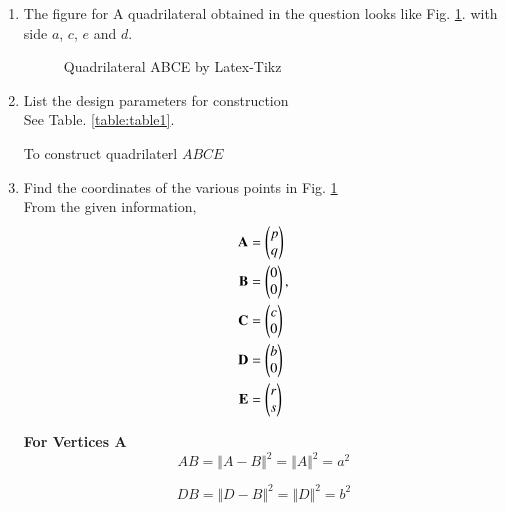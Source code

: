 \renewcommand{\theequation}{\theenumi}
\begin{enumerate}[label=\thesection.\arabic*.,ref=\thesection.\theenumi]
\item The figure for A quadrilateral obtained in the question looks like Fig. \ref{fig:quad}.
with side $a$, $c$, $e$ and $d$.
\\
\begin{figure}[!ht]
\centering
\resizebox{\columnwidth}{!}{}
\caption{Quadrilateral ABCE by Latex-Tikz}
\label{fig:quad}	
\end{figure}
%
%
%
\item List the design parameters for construction
\label{const:table1}
\\
\solution See Table. \ref{table:table1}. 
%
\begin{table}[ht!]
\centering

\caption{To construct quadrilaterl $ABCE$}
\label{table:table1}	
\end{table}
\item Find the coordinates of the various points in Fig. \ref{fig:quad}
\label{const:quad}
\\
%
\solution From the given information, 
\begin{align}
\label{eq:constr_a}
\mathbf{A} &= \begin{pmatrix}p\\q\end{pmatrix} 
\\
\mathbf{B} &= \begin{pmatrix}0\\0\end{pmatrix}, 
\label{eq:constr_b}
\\
\mathbf{C} &= \begin{pmatrix}c\\0\end{pmatrix}
\label{eq:constr_c}
\\
\mathbf{D} &= \begin{pmatrix}b\\0\end{pmatrix}
\label{eq:constr_d}
\\
\mathbf{E} &= \begin{pmatrix}r\\s\end{pmatrix}
\label{eq:constr_e}
\end{align}

\textbf{For Vertices A}
\\
\begin{equation} \label{eq:one}
AB={\Vert A-B \Vert}^2={\Vert A\Vert}^2=a^2
\end{equation}

\begin{equation}
DB={\Vert D-B \Vert}^2={\Vert D\Vert}^2=b^2
\end{equation}


\end{enumerate}
